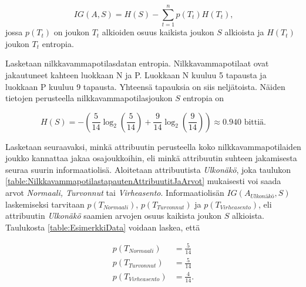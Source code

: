 \documentclass[12pt,finnish]{tktltiki2}
\theoremstyle{definition}
\theoremstyle{remark}
\begin{document}
\begin{equation}
\label{eq:informationGain}
IG(A,S) = H(S) -\sum_{t = 1}^{n} p(T_t)H(T_t) \mbox{,}
\end{equation}
jossa $p(T_t)$ on joukon $T_t$ alkioiden osuus kaikista joukon $S$ alkioista ja $H(T_t)$ joukon $T_t$
entropia. 

Lasketaan nilkkavammapotilasdatan entropia. Nilkkavammapotilaat ovat jakautuneet kahteen luokkaan N ja P.
Luokkaan N kuuluu 5 tapausta ja luokkaan P kuuluu 9 tapausta. Yhteensä tapauksia on siis neljätoista. Näiden
tietojen perusteella nilkkavammapotilasjoukon $S$ entropia on

\[ H(S) = -\left(\frac{5}{14}\log_2\left(\frac{5}{14}\right) + \frac{9}{14}\log_2\left(\frac{9}{14}\right)\right) \approx 0.940 \mbox{ bittiä.} \] 

Lasketaan seuraavaksi, minkä attribuutin perusteella koko nilkkavammapotilaiden joukko kannattaa jakaa osajoukkoihin,
eli minkä attribuutin suhteen jakamisesta seuraa suurin informaatiolisä. Aloitetaan attribuutista \textit{Ulkonäkö},
joka taulukon \ref{table:NilkkavammapotilastapautenAttribuutitJaArvot} mukaisesti
voi saada arvot \textit{Normaali, Turvonnut} tai \textit{Virheasento}. Informaatiolisän $IG(A_{\textit{Ulkonäkö}},S)$
laskemiseksi tarvitaan $p(T_{Normaali})$, $p(T_{Turvonnut})$ ja $p(T_{Virheasento})$, eli attribuutin \textit{Ulkonäkö} saamien arvojen
osuus kaikista joukon $S$ alkioista. Taulukosta \ref{table:EsimerkkiData} voidaan laskea, että

\begin{equation*}
\begin{split}
p(T_{Normaali}) &= \frac{5}{14} \\
p(T_{Turvonnut}) &= \frac{5}{14} \\
p(T_{Virheasento}) &= \frac{4}{14} \mbox{.}
\end{split}
\end{equation*}

\end{document}
